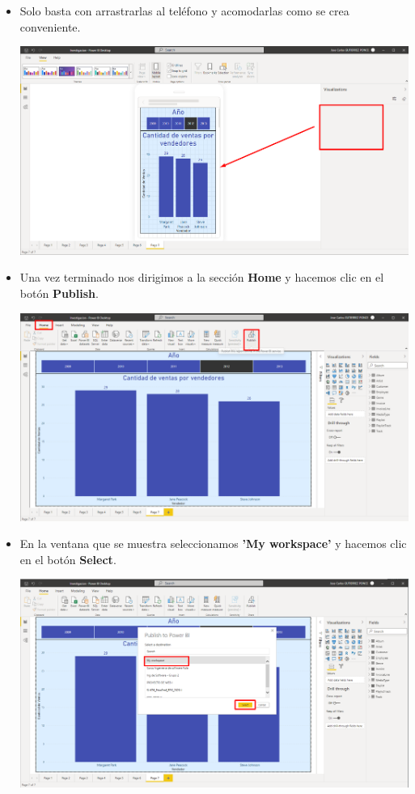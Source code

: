 \documentclass{article}
\begin{document}
\begin{enumerate}[\tab 1.]
\begin{itemize}
\begin{center}
            \end{center}
            \newpage
            \item Solo basta con arrastrarlas al teléfono y acomodarlas como se crea conveniente.
            \begin{center}
                \includegraphics[width=13cm]{./images/25.3.png}
            \end{center}
            \item Una vez terminado nos dirigimos a la sección \textbf{Home} y hacemos clic en el botón \textbf{Publish}.
            \begin{center}
                \includegraphics[width=13cm]{./images/25.4.png}
            \end{center}
            \newpage
            \item En la ventana que se muestra seleccionamos \textbf{'My workspace'} y hacemos clic en el botón \textbf{Select}.
            \begin{center}
                \includegraphics[width=13cm]{./images/25.5.png}

\end{center}
\end{itemize}
\end{enumerate}
\end{document}
